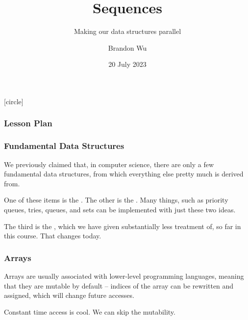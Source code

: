 \documentclass[aspectratio=169]{beamer}
\title{Sequences} %
\subtitle{Making our data structures parallel} %
\date{20 July 2023} %
\author{Brandon Wu} %
\newif\ifcolorlambda
\begin{document}
\ifweb
    \renewcommand{\pause}{}
\fi

[circle]

{
\begin{frame}[plain]
    \colorlambdatrue
    \titlepage
\end{frame}
}


\begin{frame}[fragile]
  \frametitle{Lesson Plan}

  \tableofcontents
\end{frame}


\begin{frame}[fragile]
  \frametitle{Fundamental Data Structures}

  We previously claimed that, in computer science, there are only a few
  fundamental data structures, from which everything else pretty much
  is derived from.

  \pause
  \vspace{\fill}

  One of these items is the . The other is the . Many
  things, such as priority queues, tries, queues, and sets can be implemented
  with just these two ideas.

  \pause
  \vspace{\fill}

  The third is the , which we have given substantially less
  treatment of, so far in this course. That changes today.
\end{frame}

\begin{frame}[fragile]
  \frametitle{Arrays}


  \pause
  \vspace{\fill}

  Arrays are usually associated with lower-level programming languages, meaning
  that they are mutable by default -- indices of the array can be rewritten and
  assigned, which will change future accesses.

  \pause
  \vspace{\fill}

  Constant time access is cool. We can skip the mutability.
\end{frame}
\end{document}

